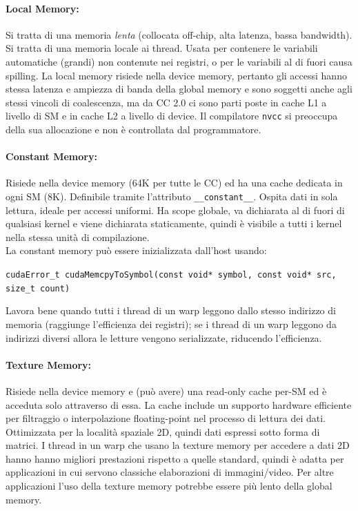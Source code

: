 \paragraph{Local Memory:} Si tratta di una memoria \textit{lenta} (collocata off-chip, alta latenza, bassa bandwidth). Si tratta di una memoria locale ai thread. Usata per contenere le variabili automatiche (grandi) non contenute nei registri, o per le variabili al di fuori causa spilling. La local memory risiede nella device memory, pertanto gli accessi hanno stessa latenza e ampiezza di banda della global memory e sono soggetti anche agli stessi vincoli di coalescenza, ma da CC 2.0 ci sono parti poste in cache L1 a livello di SM e in cache L2 a livello di device. Il compilatore \texttt{nvcc} si preoccupa della sua allocazione e non è controllata dal programmatore.\\

\paragraph{Constant Memory:} Risiede nella device memory (64K per tutte le CC) ed ha una cache dedicata in ogni SM (8K). Definibile tramite l'attributo \texttt{\_\_constant\_\_}. Ospita dati in sola lettura, ideale per accessi uniformi. Ha scope globale, va dichiarata al di fuori di qualsiasi kernel e viene dichiarata staticamente, quindi è visibile a tutti i kernel nella stessa unità di compilazione.\\
La constant memory può essere inizializzata dall'host usando:
\begin{center}
	\texttt{cudaError\_t cudaMemcpyToSymbol(const void* symbol, const void* src, size\_t count)}
\end{center}

Lavora bene quando tutti i thread di un warp leggono dallo stesso indirizzo di memoria (raggiunge l'efficienza dei registri); se i thread di un warp leggono da indirizzi diversi allora le letture vengono serializzate, riducendo l'efficienza.\\

\paragraph{Texture Memory:} Risiede nella device memory e (può avere) una read-only cache per-SM ed è acceduta solo attraverso di essa. La cache include un supporto hardware efficiente per filtraggio o interpolazione floating-point nel processo di lettura dei dati. Ottimizzata per la località spaziale 2D, quindi dati espressi sotto forma di matrici. I thread in un warp che usano la texture memory per accedere a dati 2D hanno hanno migliori prestazioni rispetto a quelle standard, quindi è adatta per applicazioni in cui servono classiche elaborazioni di immagini/video. Per altre applicazioni l’uso della texture memory potrebbe essere più lento della global memory.\\

